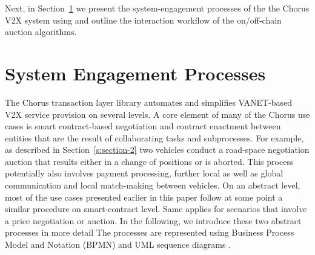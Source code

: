 \documentclass{llncs}
\begin{document}
{%
%		
%		
%		
%		
%		



		
%			

		Next, in Section~\ref{s:section-5} we present the system-engagement processes of the the Chorus V2X system using and outline the interaction workflow of the on/off-chain auction algorithms.


	
	\section{System Engagement Processes}
		\label{s:section-5}	
	
	
		The Chorus transaction layer library automates and simplifies VANET-based V2X service provision on several levels. A core element of many of the Chorus use cases is smart contract-based negotiation and contract enactment between entities that are the result of collaborating tasks and subprocesses. For example, as described in Section~\ref{s:section-2} two vehicles conduct a road-space negotiation auction that results either in a change of positions or is aborted. This process potentially also involves payment processing, further local as well as global communication and local match-making between vehicles. On an abstract level, most of the use cases presented earlier in this paper follow at some point a similar procedure on smart-contract level. Same applies for scenarios that involve a price negotiation or auction. In the following, we introduce these two abstract processes in more detail
		The processes are represented using Business Process Model and Notation (BPMN) \cite{model2011notation} and UML sequence diagrams \cite{msequenceDiagrams}.
		
}
\end{document}
